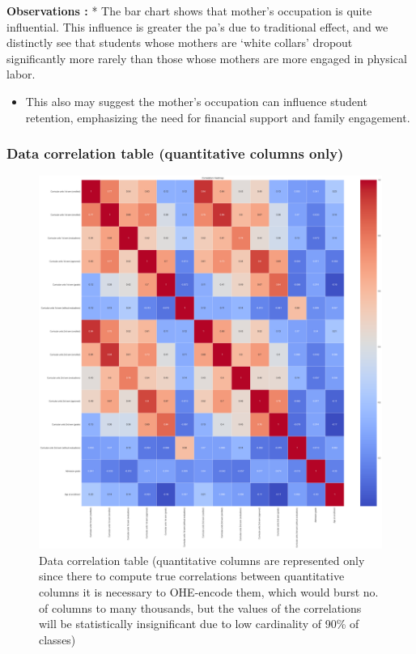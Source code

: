 \documentclass[
  letterpaper,
  DIV=11,
  numbers=noendperiod]{scrartcl}
\providecommand{\tightlist}{%
  \setlength{\itemsep}{0pt}\setlength{\parskip}{0pt}}\usepackage{longtable,booktabs,array}
\begin{document}
\textbf{Observations :} * The bar chart shows that mother's occupation
is quite influential. This influence is greater the pa's due to
traditional effect, and we distinctly see that students whose mothers
are \enquote*{white collars} dropout significantly more rarely than
those whose mothers are more engaged in physical labor.

\begin{itemize}
\tightlist
\item
  This also may suggest the mother's occupation can influence student
  retention, emphasizing the need for financial support and family
  engagement.
\end{itemize}

\hypertarget{data-correlation-table-quantitative-columns-only}{%
\subsubsection{Data correlation table (quantitative columns
only)}\label{data-correlation-table-quantitative-columns-only}}

\begin{figure}

{\centering \includegraphics{report_AzadhdhinNedalYunisAlFraijat_files/figure-pdf/fig-correlation-output-1.png}

}

\caption{\label{fig-correlation}Data correlation table (quantitative
columns are represented only since there to compute true correlations
between quantitative columns it is necessary to OHE-encode them, which
would burst no. of columns to many thousands, but the values of the
correlations will be statistically insignificant due to low cardinality
of 90\% of classes)}

\end{figure}
\end{document}
